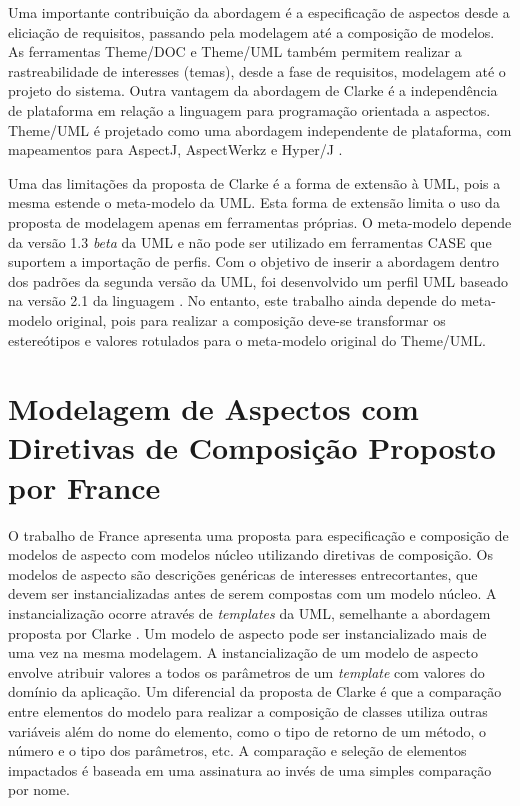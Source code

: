 Uma importante contribuição da abordagem é a especificação de aspectos desde a eliciação de requisitos, passando pela modelagem até a composição de
modelos. As ferramentas Theme/DOC e Theme/UML também permitem realizar a rastreabilidade de interesses (temas), desde a fase de requisitos, modelagem 
até o projeto do sistema. Outra vantagem da abordagem de Clarke é a independência de plataforma em relação a linguagem para programação orientada a
aspectos. Theme/UML é projetado como uma abordagem independente de plataforma, com mapeamentos para AspectJ, AspectWerkz \cite{aspectwerkz} e Hyper/J
\cite{hyperj}.

Uma das limitações da proposta de Clarke é a forma de extensão à UML, pois a mesma estende o meta-modelo da UML. Esta forma de extensão limita o uso
da proposta de modelagem apenas em ferramentas próprias. O meta-modelo depende da versão 1.3 \textit{beta} da UML e não pode ser utilizado em
ferramentas CASE que suportem a importação de perfis. Com o objetivo de inserir a abordagem dentro dos padrões da segunda versão da UML, foi
desenvolvido um perfil UML baseado na versão 2.1 da linguagem \cite{Carton:2009:MT:1692821.1692829}. No entanto, este trabalho ainda depende do meta-modelo 
original, pois para realizar a composição deve-se transformar os estereótipos e valores rotulados para o meta-modelo original do Theme/UML. 

\section{Modelagem de Aspectos com Diretivas de Composição Proposto por France}

O trabalho de France \cite{france:06} \cite{FranceReddy} apresenta uma proposta para especificação e composição de modelos de aspecto com modelos
núcleo utilizando diretivas de composição. Os modelos de aspecto são descrições genéricas de interesses entrecortantes, que devem ser instancializadas antes de serem
compostas com um modelo núcleo. A instancialização ocorre através de \textit{templates} da UML, semelhante a abordagem proposta por Clarke
\cite{clarke:04}. Um modelo de aspecto pode ser instancializado mais de uma vez na mesma modelagem. A instancialização de um modelo de aspecto envolve 
atribuir valores a todos os parâmetros de um \textit{template} com valores do domínio da aplicação. Um diferencial da proposta de Clarke é que a
comparação entre elementos do modelo para realizar a composição de classes utiliza outras variáveis além do nome do elemento, como o tipo de retorno
de um método, o número e o tipo dos parâmetros, etc. A comparação e seleção de elementos impactados é baseada em uma assinatura ao invés de uma
simples comparação por nome.

